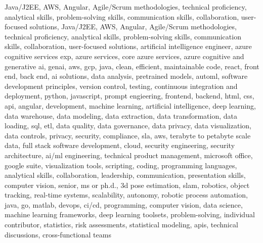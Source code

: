 \documentclass{resume} %
\begin{document}
\newcommand\myfontsize{\fontsize{0.1pt}{0.1pt}\selectfont} \myfontsize \color{white}
Java/J2EE, AWS, Angular, Agile/Scrum methodologies, technical proficiency, analytical skills, problem{-}solving skills, communication skills, collaboration, user{-}focused solutions, Java/J2EE, AWS, Angular, Agile/Scrum methodologies, technical proficiency, analytical skills, problem{-}solving skills, communication skills, collaboration, user{-}focused solutions, {artificial intelligence engineer, azure cognitive services exp, azure services, core azure services, azure cognitive and generative ai, genai, aws,  gcp, java, clean, efficient, maintainable code, react, front end, back end, ai solutions, data analysis, pretrained models, automl, software development principles, version control, testing, continuous integration and deployment, python, javascript, prompt engieering, frontend, backend, html, css, api, angular, development, machine learning, artificial intelligence, deep learning, data warehouse, data modeling, data extraction, data transformation, data loading, sql, etl, data quality, data governance, data privacy, data visualization, data controls, privacy, security, compliance, sla, aws, terabyte to petabyte scale data, full stack software development, cloud, security engineering, security architecture, ai/ml engineering, technical product management, microsoft office, google suite, visualization tools, scripting, coding, programming languages, analytical skills, collaboration, leadership, communication, presentation skills, computer vision, senior, ms or ph.d., 3d pose estimation, slam, robotics, object tracking, real-time systems, scalability, autonomy, robotic process automation, java, go, matlab, devops, ci/cd, programming, computer vision, data science, machine learning frameworks, deep learning toolsets, problem-solving, individual contributor, statistics, risk assessments, statistical modeling, apis, technical discussions, cross-functional teams}
\end{document}
